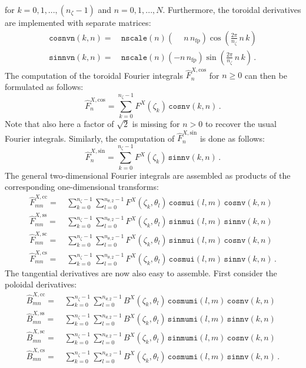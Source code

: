 for $k=0,1, ..., (n_\zeta-1)$ and $n=0,1, ..., N$.
Furthermore, the toroidal derivatives are implemented with separate matrices:
\begin{align}
  \texttt{cosnvn}(k,n) =&\, \texttt{nscale}(n) (\phantom{-} n \,n_\mathrm{fp}) \cos\left(\frac{2 \pi}{n_\zeta} \,n \,k\right) \\
  \texttt{sinnvn}(k,n) =&\, \texttt{nscale}(n) (         -  n \,n_\mathrm{fp}) \sin\left(\frac{2 \pi}{n_\zeta} \,n \,k\right) \, .
\end{align}
The computation of the toroidal Fourier integrals $\hat{F}^{X,\mathrm{cos}}_n$ for $n\geq0$ can then be formulated as follows:
\begin{equation}
  \hat{F}^{X,\mathrm{cos}}_n = \sum\limits_{k=0}^{n_\zeta-1} F^{X}(\zeta_k) \, \texttt{cosnv}(k,n) \, .
\end{equation}
Note that also here a factor of $\sqrt{2}$ is missing for $n>0$ to recover the usual Fourier integrals.
Similarly, the computation of $\hat{F}^{X,\mathrm{sin}}_n$ is done as follows:
\begin{equation}
  \hat{F}^{X,\mathrm{sin}}_n = \sum\limits_{k=0}^{n_\zeta-1} F^{X}(\zeta_k) \, \texttt{sinnv}(k,n) \, .
\end{equation}
The general two-dimensional Fourier integrals are assembled
as products of the corresponding one-dimensional transforms:
\begin{align}
  \hat{F}^{X,\mathrm{cc}}_{mn} =&\, \sum\limits_{k=0}^{n_\zeta-1} \sum\limits_{l=0}^{n_{\theta,2}-1} F^{X}(\zeta_k, \theta_l) \, \texttt{cosmui}(l,m) \, \texttt{cosnv}(k,n) \\
  \hat{F}^{X,\mathrm{ss}}_{mn} =&\, \sum\limits_{k=0}^{n_\zeta-1} \sum\limits_{l=0}^{n_{\theta,2}-1} F^{X}(\zeta_k, \theta_l) \, \texttt{sinmui}(l,m) \, \texttt{sinnv}(k,n) \\
  \hat{F}^{X,\mathrm{sc}}_{mn} =&\, \sum\limits_{k=0}^{n_\zeta-1} \sum\limits_{l=0}^{n_{\theta,2}-1} F^{X}(\zeta_k, \theta_l) \, \texttt{sinmui}(l,m) \, \texttt{cosnv}(k,n) \\
  \hat{F}^{X,\mathrm{cs}}_{mn} =&\, \sum\limits_{k=0}^{n_\zeta-1} \sum\limits_{l=0}^{n_{\theta,2}-1} F^{X}(\zeta_k, \theta_l) \, \texttt{cosmui}(l,m) \, \texttt{sinnv}(k,n) \, .
\end{align}
The tangential derivatives are now also easy to assemble.
First consider the poloidal derivatives:
\begin{align}
  \hat{B}^{X,\mathrm{cc}}_{mn} =&\, \sum\limits_{k=0}^{n_\zeta-1} \sum\limits_{l=0}^{n_{\theta,2}-1} B^{X}(\zeta_k, \theta_l) \, \texttt{cosmumi}(l,m) \, \texttt{cosnv}(k,n) \\
  \hat{B}^{X,\mathrm{ss}}_{mn} =&\, \sum\limits_{k=0}^{n_\zeta-1} \sum\limits_{l=0}^{n_{\theta,2}-1} B^{X}(\zeta_k, \theta_l) \, \texttt{sinmumi}(l,m) \, \texttt{sinnv}(k,n) \\
  \hat{B}^{X,\mathrm{sc}}_{mn} =&\, \sum\limits_{k=0}^{n_\zeta-1} \sum\limits_{l=0}^{n_{\theta,2}-1} B^{X}(\zeta_k, \theta_l) \, \texttt{sinmumi}(l,m) \, \texttt{cosnv}(k,n) \\
  \hat{B}^{X,\mathrm{cs}}_{mn} =&\, \sum\limits_{k=0}^{n_\zeta-1} \sum\limits_{l=0}^{n_{\theta,2}-1} B^{X}(\zeta_k, \theta_l) \, \texttt{cosmumi}(l,m) \, \texttt{sinnv}(k,n) \, .
\end{align}
